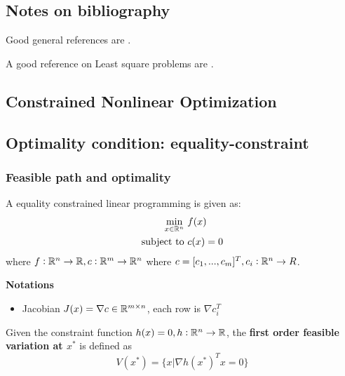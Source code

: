 \begin{refsection}
\section{Notes on bibliography}

Good general references are \cite{bertsekas2016nonlinear}\cite{nocedal2006numerical}\cite{Robinson2015nonlinear}. 

A good reference on Least square problems are \cite{pighin2007practical}.
\printbibliography
\end{refsection}
\begin{refsection}
\startcontents[chapters]	
\chapter{Constrained Nonlinear Optimization}\label{ch:constrained-nonlinear-optimization}
\section{Optimality condition: equality-constraint}
\subsection{Feasible path and optimality}
\begin{definition}
\label{ch:constrained-nonlinear-optimization:def:equalityconstraintoptimization}
A equality constrained linear programming is given as:
\begin{align*}
    \min_{x\in \mathbb{R}^n} ~ & f(x)\\
    \text{subject to} ~ & c(x) = 0
\end{align*}
where $f:\mathbb{R}^n \to \mathbb{R},c:\mathbb{R}^m\to \mathbb{R}^n$ where $c=[c_1,...,c_m]^T,c_i:\mathbb{R}^n \to R$.
\end{definition}


\begin{mdframed}
\textbf{Notations}\\
\begin{itemize}
    \item Jacobian $J(x) = \nabla c \in \mathbb{R}^{m\times n}$, each row is $\nabla c_i^T$
\end{itemize}
\end{mdframed}

\iffalse



\begin{definition}
Given the constraint function $h(x) = 0, h:\mathbb{R}^n\to \mathbb{R}$, the \textbf{first order feasible variation at $x^*$} is defined as
$$V(x^*) = \{x | \nabla h(x^*)^Tx = 0 \}$$
\end{definition}


\end{refsection}
